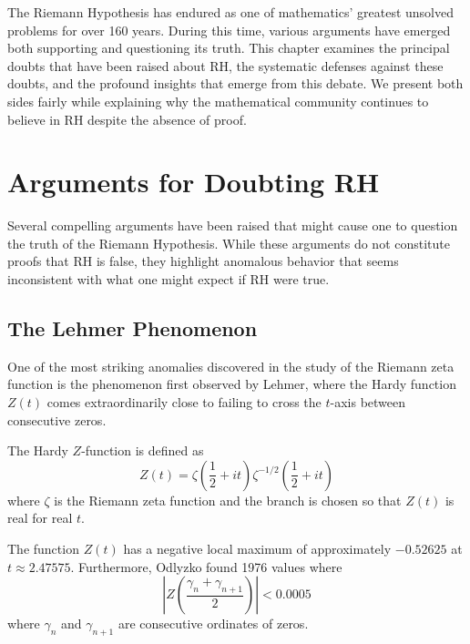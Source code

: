 \label{ch:doubts_defenses}

The Riemann Hypothesis has endured as one of mathematics' greatest unsolved problems for over 160 years. During this time, various arguments have emerged both supporting and questioning its truth. This chapter examines the principal doubts that have been raised about RH, the systematic defenses against these doubts, and the profound insights that emerge from this debate. We present both sides fairly while explaining why the mathematical community continues to believe in RH despite the absence of proof.

\section{Arguments for Doubting RH}
\label{sec:doubts}

Several compelling arguments have been raised that might cause one to question the truth of the Riemann Hypothesis. While these arguments do not constitute proofs that RH is false, they highlight anomalous behavior that seems inconsistent with what one might expect if RH were true.

\subsection{The Lehmer Phenomenon}
\label{subsec:lehmer}

One of the most striking anomalies discovered in the study of the Riemann zeta function is the phenomenon first observed by Lehmer, where the Hardy function $Z(t)$ comes extraordinarily close to failing to cross the $t$-axis between consecutive zeros.

\begin{definition}
The Hardy $Z$-function is defined as
\begin{equation}
Z(t) = \zeta\left(\frac{1}{2} + it\right) \zeta^{-1/2}\left(\frac{1}{2} + it\right)
\end{equation}
where $\zeta$ is the Riemann zeta function and the branch is chosen so that $Z(t)$ is real for real $t$.
\end{definition}

\begin{theorem}
The function $Z(t)$ has a negative local maximum of approximately $-0.52625$ at $t \approx 2.47575$. Furthermore, Odlyzko found 1976 values where 
\begin{equation}
\left|Z\left(\frac{\gamma_n + \gamma_{n+1}}{2}\right)\right| < 0.0005
\end{equation}
where $\gamma_n$ and $\gamma_{n+1}$ are consecutive ordinates of zeros.
\end{theorem}

